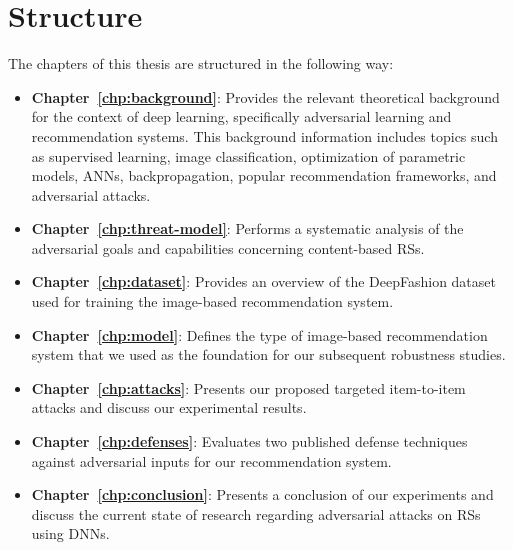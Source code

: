 \section{Structure}
The chapters of this thesis are structured in the following way:
\begin{itemize}
	\item \textbf{Chapter~\ref{chp:background}}: Provides the relevant theoretical background for the context of deep learning, specifically adversarial learning and recommendation systems. This background information includes topics such as supervised learning, image classification, optimization of parametric models, \acp{ANN}, backpropagation, popular recommendation frameworks, and adversarial attacks.
	
	\item \textbf{Chapter~\ref{chp:threat-model}}: Performs a systematic analysis of the adversarial goals and capabilities concerning content-based \acp{RS}.
	
	\item \textbf{Chapter~\ref{chp:dataset}}: Provides an overview of the DeepFashion dataset used for training the image-based recommendation system.
	
	\item \textbf{Chapter~\ref{chp:model}}: Defines the type of image-based recommendation system that we used as the foundation for our subsequent robustness studies.
	
	\item \textbf{Chapter~\ref{chp:attacks}}: Presents our proposed targeted item-to-item attacks and discuss our experimental results.
	
	\item \textbf{Chapter~\ref{chp:defenses}}: Evaluates two published defense techniques against adversarial inputs for our recommendation system.

	\item \textbf{Chapter~\ref{chp:conclusion}}: Presents a conclusion of our experiments and discuss the current state of research regarding adversarial attacks on \acp{RS} using \acp{DNN}.
\end{itemize}


